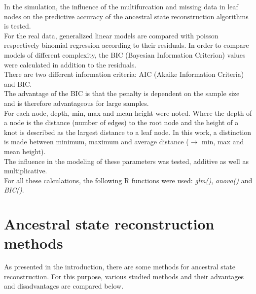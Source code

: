       In the simulation, the influence of the multifurcation and missing data in leaf nodes on the 
        predictive accuracy of the ancestral state reconstruction algorithms is tested. \\
      For the real data, generalized linear models are compared with poisson respectively binomial 
        regression according to their residuals. In order to compare models of different complexity, the 
        BIC (Bayesian Information Criterion) values were calculated in addition to the residuals.\\
      There are two different information criteria: AIC (Akaike Information Criteria) and BIC. \\
      The advantage of the BIC is that the penalty is dependent on the sample size and is therefore 
        advantageous for large samples. \\

      For each node, depth, min, max and mean height were noted. Where the depth of a node is the 
        distance (number of edges) to the root node and the height of a knot is described as the 
        largest distance to a leaf node. In this work, a distinction is made between minimum, maximum 
        and average distance ($\rightarrow$ min, max and mean height). \\
      The influence in the modeling of these parameters was tested, additive as well as multiplicative. \\

      For all these calculations, the following R functions were used: \textit{glm()}, \textit{anova()} 
        and \textit{BIC()}.

  \section{Ancestral state reconstruction methods} \label{sec:ancestral state reconstruction}
    As presented in the introduction, there are some methods for ancestral state reconstruction. For 
      this purpose, various studied methods and their advantages and disadvantages are compared below. \\
  

